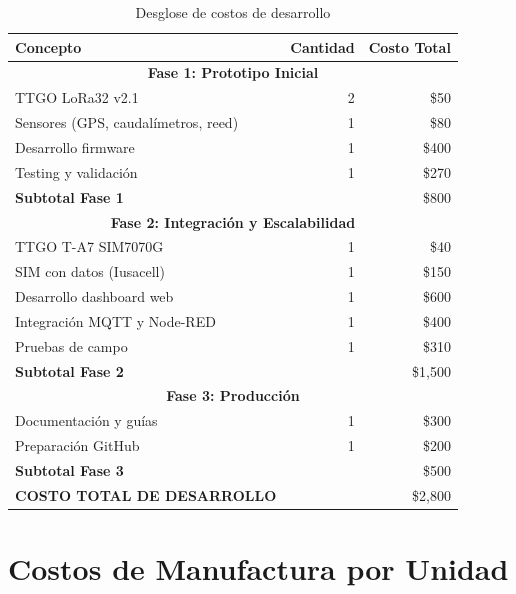 \documentclass[12pt,a4paper,oneside]{report}
\begin{document}
\begin{table}[H]
    \centering
    \begin{tabular}{|l|r|r|}
        \hline
        \textbf{Concepto} & \textbf{Cantidad} & \textbf{Costo Total} \\
        \hline
        \multicolumn{3}{|c|}{\textbf{Fase 1: Prototipo Inicial}} \\
        \hline
        TTGO LoRa32 v2.1 & 2 & \$50 \\
        Sensores (GPS, caudalímetros, reed) & 1 & \$80 \\
        Desarrollo firmware & 1 & \$400 \\
        Testing y validación & 1 & \$270 \\
        \hline
        \textbf{Subtotal Fase 1} & & \$800 \\
        \hline
        \multicolumn{3}{|c|}{\textbf{Fase 2: Integración y Escalabilidad}} \\
        \hline
        TTGO T-A7 SIM7070G & 1 & \$40 \\
        SIM con datos (Iusacell) & 1 & \$150 \\
        Desarrollo dashboard web & 1 & \$600 \\
        Integración MQTT y Node-RED & 1 & \$400 \\
        Pruebas de campo & 1 & \$310 \\
        \hline
        \textbf{Subtotal Fase 2} & & \$1,500 \\
        \hline
        \multicolumn{3}{|c|}{\textbf{Fase 3: Producción}} \\
        \hline
        Documentación y guías & 1 & \$300 \\
        Preparación GitHub & 1 & \$200 \\
        \hline
        \textbf{Subtotal Fase 3} & & \$500 \\
        \hline
        \textbf{COSTO TOTAL DE DESARROLLO} & & \$2,800 \\
        \hline
    \end{tabular}
    \caption{Desglose de costos de desarrollo}
\end{table}

\section{Costos de Manufactura por Unidad}
\end{document}
